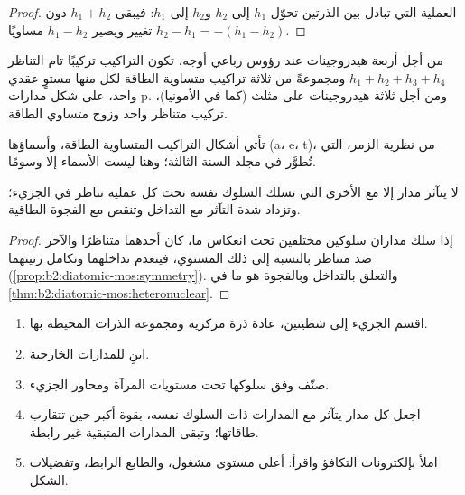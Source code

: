 \begin{proof}
العملية التي تبادل بين الذرتين تحوّل $h_1$ إلى $h_2$ و$h_2$ إلى
$h_1$: فيبقى $h_1 + h_2$ دون تغيير ويصير $h_1 - h_2$ مساويًا $h_2 - h_1 = -(h_1 - h_2)$.
\end{proof}

\begin{proposition}\label{prop:b2:fragment-orbitals:h4}
من أجل أربعة هيدروجينات عند رؤوس رباعي أوجه، تكون التراكيب تركيبًا
تام التناظر $h_1 + h_2 + h_3 + h_4$ ومجموعةً من ثلاثة تراكيب متساوية
الطاقة لكل منها مستوٍ عقدي واحد، على شكل مدارات p. ومن أجل ثلاثة
هيدروجينات على مثلث (كما في الأمونيا)، تركيب متناظر واحد وزوج
متساوي الطاقة.
\end{proposition}

\admitted

تأتي أشكال التراكيب المتساوية الطاقة، وأسماؤها (a، e، t)، من
نظرية الزمر، التي تُطوَّر في مجلد السنة الثالثة؛ وهنا ليست الأسماء إلا وسومًا.

\begin{proposition}\label{prop:b2:fragment-orbitals:interaction-rules}
لا يتآثر مدار  إلا مع  الأخرى التي
تسلك السلوك نفسه تحت كل عملية تناظر في الجزيء؛ وتزداد
شدة التآثر مع التداخل وتنقص مع الفجوة
الطاقية.
\end{proposition}

\begin{proof}
إذا سلك مداران سلوكين مختلفين تحت انعكاس ما، كان أحدهما متناظرًا 
والآخر ضد متناظر بالنسبة إلى ذلك المستوي، فينعدم تداخلهما وتكامل
رنينهما (\cref{prop:b2:diatomic-mos:symmetry}). والتعلق بالتداخل
وبالفجوة هو ما في \cref{thm:b2:diatomic-mos:heteronuclear}.
\end{proof}

\begin{method}\label{met:b2:fragment-orbitals:fragment-diagram}
\begin{enumerate}
  \item اقسم الجزيء إلى شظيتين، عادة ذرة مركزية ومجموعة
        الذرات المحيطة بها.
  \item ابنِ  للمدارات الخارجية.
  \item صنّف  وفق سلوكها تحت مستويات المرآة
        ومحاور الجزيء.
  \item اجعل كل مدار يتآثر مع المدارات ذات السلوك نفسه، بقوة أكبر
        حين تتقارب طاقاتها؛ وتبقى المدارات المتبقية غير رابطة.
  \item املأ بإلكترونات التكافؤ واقرأ: أعلى مستوى مشغول،
        والطابع الرابط، وتفضيلات الشكل.
\end{enumerate}
\end{method}

